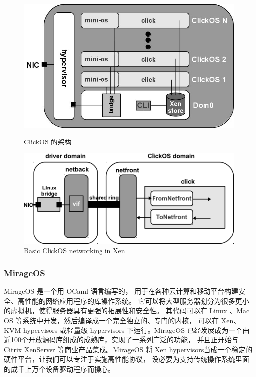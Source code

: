 \documentclass{../runikraft-report}
\begin{document}
\begin{figure}[!hbt]
\begin{minipage}{0.49\linewidth}
\includegraphics[width=\linewidth]{assets/clickOS_arch.jpg}
\caption{ClickOS 的架构\cite{bib:13-clickos2}}
\end{minipage}
\begin{minipage}{0.49\linewidth}
\includegraphics[width=\linewidth]{assets/ClickOS_networking.png}
\caption{Basic ClickOS networking in Xen\cite{bib:12-clickos}}
\end{minipage}
\end{figure}

\subsubsection{MirageOS}

MirageOS 是一个用 OCaml 语言编写的，
用于在各种云计算和移动平台构建安全、高性能的网络应用程序的库操作系统。
它可以将大型服务器划分为很多更小的虚拟机，使得服务器具有更强的拓展性和安全性。
其代码可以在 Linux 、Mac OS 等系统中开发，然后编译成一个完全独立的、专门的内核，
可以在 Xen、KVM hypervisors 或轻量级 hypervisors 下运行。MirageOS
已经发展成为一个由近100个开放源码库组成的成熟库，实现了一系列广泛的功能，
并且正开始与 Citrix XenServer 等商业产品集成。MirageOS
将 Xen hypervisors当成一个稳定的硬件平台，让我们可以专注于实施高性能协议，
没必要为支持传统操作系统里面的成千上万个设备驱动程序而操心。\cite{bib:11-unikerel2}
\end{document}
